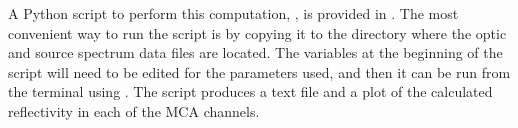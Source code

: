 A Python script to perform this computation, , is provided
in . The most convenient way to run the script is by
copying it to the directory where the optic and source spectrum data files are
located. The variables at the beginning of the script will need to be edited for
the parameters used, and then it can be run from the terminal using
. The script produces a text file and a plot of the
calculated reflectivity in each of the MCA channels.

